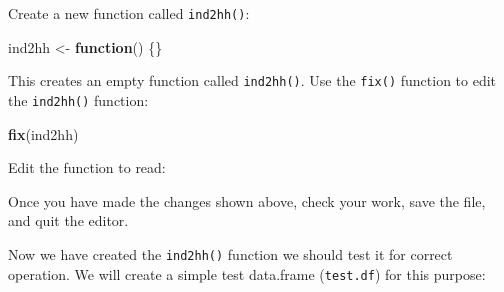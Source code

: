 \documentclass[12pt,a4paper]{book}
\newenvironment{Shaded}{\begin{snugshade}}{\end{snugshade}}
\newcommand{\KeywordTok}[1]{\textcolor[rgb]{0.13,0.29,0.53}{\textbf{#1}}}
\newcommand{\StringTok}[1]{\textcolor[rgb]{0.31,0.60,0.02}{#1}}
\newcommand{\OtherTok}[1]{\textcolor[rgb]{0.56,0.35,0.01}{#1}}
\newcommand{\ControlFlowTok}[1]{\textcolor[rgb]{0.13,0.29,0.53}{\textbf{#1}}}
\newcommand{\OperatorTok}[1]{\textcolor[rgb]{0.81,0.36,0.00}{\textbf{#1}}}
\newcommand{\NormalTok}[1]{#1}
\theoremstyle{definition}
\theoremstyle{definition}
\theoremstyle{definition}
\theoremstyle{remark}
\begin{document}
Create a new function called \texttt{ind2hh()}:

\begin{Shaded}
\begin{Highlighting}[]
\NormalTok{ind2hh <-}\StringTok{ }\ControlFlowTok{function}\NormalTok{() \{\}}
\end{Highlighting}
\end{Shaded}

This creates an empty function called \texttt{ind2hh()}. Use the
\texttt{fix()} function to edit the \texttt{ind2hh()} function:

\begin{Shaded}
\begin{Highlighting}[]
\KeywordTok{fix}\NormalTok{(ind2hh)}
\end{Highlighting}
\end{Shaded}

Edit the function to read:

\begin{Shaded}
\end{Shaded}

Once you have made the changes shown above, check your work, save the
file, and quit the editor.

Now we have created the \texttt{ind2hh()} function we should test it for
correct operation. We will create a simple test data.frame
(\texttt{test.df}) for this purpose:
\end{document}
